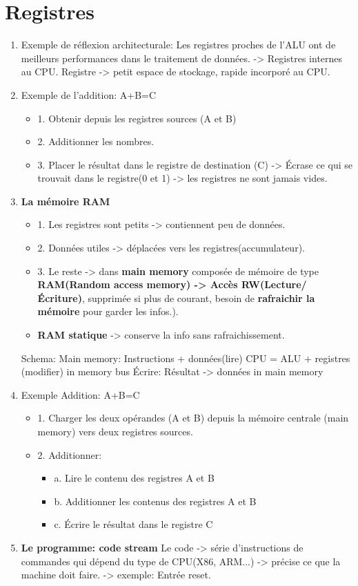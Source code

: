 \section{Registres}
\begin{enumerate}
\item Exemple de réflexion architecturale: 
Les registres proches de l'ALU ont de meilleurs performances dans le traitement de données. -> Registres internes au CPU.
Registre -> petit espace de stockage, rapide incorporé au CPU.

\bigskip
\item Exemple de l'addition: A+B=C
\begin{itemize}
  \item 1. Obtenir depuis les registres sources (A et B)
  \item 2. Additionner les nombres.
  \item 3. Placer le résultat dans le registre de destination (C) -> Écrase ce qui se trouvait dans le registre(0 et 1) -> les registres ne sont jamais vides.
\end{itemize}
\item{\textbf{La mémoire RAM}}
\begin{itemize}
  \item 1. Les registres sont petits -> contiennent peu de données.
  \item 2. Données utiles -> déplacées vers les registres(accumulateur).
  \item 3. Le reste -> dans \textbf{main memory} composée de mémoire de type \textbf{RAM(Random access memory) -> Accès RW(Lecture/Écriture)}, supprimée si plus de courant, besoin de \textbf{rafraichir la mémoire} pour garder les infos.).
  \item \textbf{RAM statique} -> conserve la info sans rafraichissement.
\end{itemize}
Schema: Main memory: Instructions + données(lire)
CPU = ALU + registres (modifier) in memory bus
Écrire: Résultat -> données in main memory

\item Exemple Addition: A+B=C
\begin{itemize}
  \item1. Charger les deux opérandes (A et B) depuis la mémoire centrale (main memory) vers deux registres sources.

  \item 2. Additionner:
  \begin{itemize}
    \item a. Lire le contenu des registres A et B
    \item b. Additionner les contenus des registres A et B
    \item c. Écrire le résultat dans le registre C
  \end{itemize}
\end{itemize}
\item \textbf{Le programme: code stream}
Le code -> série d'instructions de commandes qui dépend du type de CPU(X86, ARM...) -> précise ce que la machine doit faire. -> exemple: Entrée reset.


\end{enumerate}
